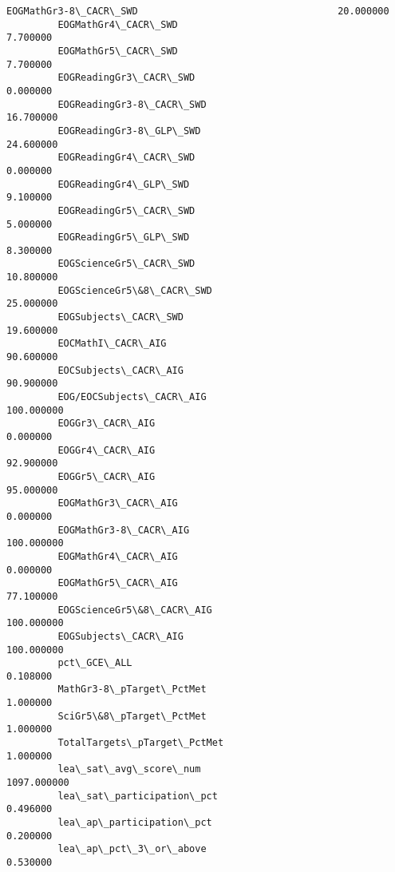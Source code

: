 \documentclass[11pt]{article}
\begin{document}
\begin{Verbatim}[commandchars=\\\{\}]
         EOGMathGr3-8\_CACR\_SWD                                   20.000000   
         EOGMathGr4\_CACR\_SWD                                      7.700000   
         EOGMathGr5\_CACR\_SWD                                      7.700000   
         EOGReadingGr3\_CACR\_SWD                                   0.000000   
         EOGReadingGr3-8\_CACR\_SWD                                16.700000   
         EOGReadingGr3-8\_GLP\_SWD                                 24.600000   
         EOGReadingGr4\_CACR\_SWD                                   0.000000   
         EOGReadingGr4\_GLP\_SWD                                    9.100000   
         EOGReadingGr5\_CACR\_SWD                                   5.000000   
         EOGReadingGr5\_GLP\_SWD                                    8.300000   
         EOGScienceGr5\_CACR\_SWD                                  10.800000   
         EOGScienceGr5\&8\_CACR\_SWD                                25.000000   
         EOGSubjects\_CACR\_SWD                                    19.600000   
         EOCMathI\_CACR\_AIG                                       90.600000   
         EOCSubjects\_CACR\_AIG                                    90.900000   
         EOG/EOCSubjects\_CACR\_AIG                               100.000000   
         EOGGr3\_CACR\_AIG                                          0.000000   
         EOGGr4\_CACR\_AIG                                         92.900000   
         EOGGr5\_CACR\_AIG                                         95.000000   
         EOGMathGr3\_CACR\_AIG                                      0.000000   
         EOGMathGr3-8\_CACR\_AIG                                  100.000000   
         EOGMathGr4\_CACR\_AIG                                      0.000000   
         EOGMathGr5\_CACR\_AIG                                     77.100000   
         EOGScienceGr5\&8\_CACR\_AIG                               100.000000   
         EOGSubjects\_CACR\_AIG                                   100.000000   
         pct\_GCE\_ALL                                              0.108000   
         MathGr3-8\_pTarget\_PctMet                                 1.000000   
         SciGr5\&8\_pTarget\_PctMet                                  1.000000   
         TotalTargets\_pTarget\_PctMet                              1.000000   
         lea\_sat\_avg\_score\_num                                 1097.000000   
         lea\_sat\_participation\_pct                                0.496000   
         lea\_ap\_participation\_pct                                 0.200000   
         lea\_ap\_pct\_3\_or\_above                                    0.530000   

\end{Verbatim}
\end{document}
